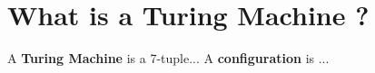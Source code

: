 \documentclass{article}
\begin{document}
\section{What is a Turing Machine ?}

A \textbf{Turing Machine} is a 7-tuple...
A \textbf{configuration} is ...

\end{document}

